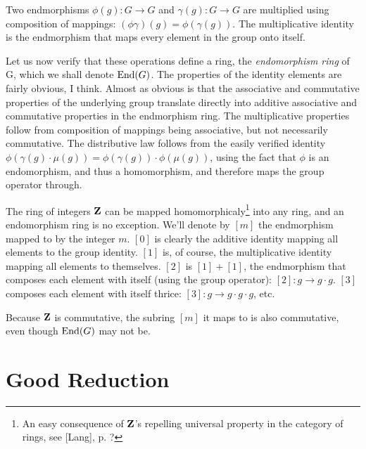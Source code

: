 Two endmorphisms $\phi(g): G \to G$ and $\gamma(g): G \to G$ are
multiplied using composition of mappings: $(\phi\gamma)(g) =
\phi(\gamma(g))$.  The multiplicative identity is the endmorphism that
maps every element in the group onto itself.

Let us now verify that these operations define a ring, the {\it endomorphism
ring} of G, which we shall denote ${\rm End}(G)$.  The properties
of the identity elements are fairly obvious, I think.  Almost as
obvious is that the associative and commutative properties of the
underlying group translate directly into additive associative and
commutative properties in the endmorphism ring.  The multiplicative
properties follow from composition of mappings being associative, but
not necessarily commutative.  The distributive law follows from the
easily verified identity $\phi(\gamma(g)\cdot\mu(g)) = \phi(\gamma(g)) \cdot
\phi(\mu(g))$, using the fact that $\phi$ is an endomorphism, and thus
a homomorphism, and therefore maps the group operator through.

The ring of integers ${\bf Z}$ can be mapped homomorphicaly\footnote{An easy
consequence of ${\bf Z}$'s repelling universal property in the category of
rings, see [Lang], p. ?} into any ring, and an endomorphism ring is no
exception.  We'll denote by $[m]$ the endmorphism mapped to by the
integer $m$. $[0]$ is clearly the additive identity mapping all
elements to the group identity.  $[1]$ is, of course, the
multiplicative identity mapping all elements to themselves.  $[2]$ is
$[1]+[1]$, the endmorphism that composes each element with itself
(using the group operator): $[2]: g \to g\cdot g$.  $[3]$ composes
each element with itself thrice: $[3]: g \to g\cdot g\cdot g$, etc.

Because ${\bf Z}$ is commutative, the subring $[m]$ it maps to is also
commutative, even though ${\rm End}(G)$ may not be.



\section{Good Reduction}
